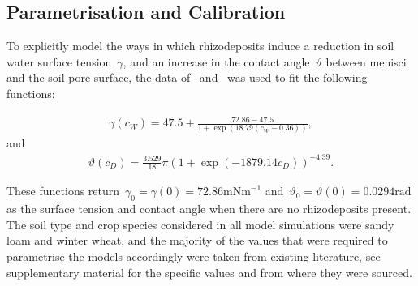 \documentclass[11pt,a4paper]{article}
\numberwithin{equation}{section}
\begin{document}
\subsection{Parametrisation and Calibration}\label{subsec: parametrisation and calibration}  	      
To explicitly model the ways in which rhizodeposits induce a reduction in soil water surface tension~$\gamma$, and an increase in the contact angle~$\vartheta$ between menisci and the soil pore surface, the data of~\cite{read2003plant} and~\cite{zickenrott2016efficient} was used to fit the following functions:
\begin{linenomath*}
	\begin{equation}\label{model: surface tension}
		\begin{aligned}
			\gamma(c_W) = 47.5 +\frac{72.86-47.5}{1 + \exp(18.79(c_W-0.36))},
		\end{aligned}
	\end{equation}
	and
	\begin{equation}\label{model: contact angle}
		\begin{aligned}
			\vartheta(c_D) = \frac{3.529}{18}\pi(1+\exp(-1879.14c_D))^{-4.39}.
		\end{aligned}
	\end{equation}
\end{linenomath*}
These functions return~$\gamma_0=\gamma(0)=72.86\text{mNm}^{-1}$ and~$\vartheta_0 = \vartheta(0) = 0.0294\text{rad}$ as the surface tension and contact angle when there are no rhizodeposits present. The soil type and crop species considered in all model simulations were sandy loam and winter wheat, and the majority of the values that were required to parametrise the models accordingly were taken from existing literature, see supplementary material for the specific values and from where they were sourced. 
\end{document}
